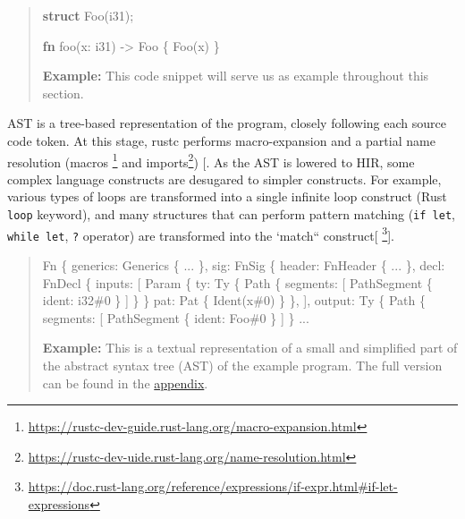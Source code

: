 \documentclass[
  11pt,
  twoside]{report}
\newenvironment{Shaded}{}{}
\newcommand{\KeywordTok}[1]{\textbf{#1}}
\newcommand{\NormalTok}[1]{#1}
\newcommand{\OperatorTok}[1]{#1}
\begin{document}
\begin{quote}
\begin{Shaded}
\begin{Highlighting}[]
\KeywordTok{struct}\NormalTok{ Foo(i31)}\OperatorTok{;}

\KeywordTok{fn}\NormalTok{ foo(x}\OperatorTok{:}\NormalTok{ i31) }\OperatorTok{{-}\textgreater{}}\NormalTok{ Foo }\OperatorTok{\{}
\NormalTok{    Foo(x)}
\OperatorTok{\}}
\end{Highlighting}
\end{Shaded}

\textbf{Example:} This code snippet will serve us as example throughout
this section.
\end{quote}

AST is a tree-based representation of the program, closely following
each source code token. At this stage, rustc performs macro-expansion
and a partial name resolution (macros \footnote{\url{https://rustc-dev-guide.rust-lang.org/macro-expansion.html}}
and imports\footnote{\url{https://rustc-dev-uide.rust-lang.org/name-resolution.html}})
{[}\citeproc{ref-devguide}{13}{]}. As the AST is lowered to HIR, some
complex language constructs are desugared to simpler constructs. For
example, various types of loops are transformed into a single infinite
loop construct (Rust \texttt{loop} keyword), and many structures that
can perform pattern matching (\texttt{if\ let}, \texttt{while\ let},
\texttt{?} operator) are transformed into the `match``
construct{[} \footnote{\url{https://doc.rust-lang.org/reference/expressions/if-expr.html\#if-let-expressions}}{]}.

\begin{quote}
\begin{Shaded}
\begin{Highlighting}[]
\NormalTok{Fn \{}
\NormalTok{  generics: Generics \{ ... \},}
\NormalTok{  sig: FnSig \{}
\NormalTok{    header: FnHeader \{ ... \},}
\NormalTok{    decl: FnDecl \{}
\NormalTok{      inputs: [}
\NormalTok{        Param \{}
\NormalTok{          ty: Ty \{ }
\NormalTok{            Path \{ segments: [ PathSegment \{ ident: i32\#0 \} ] \}}
\NormalTok{          \}}
\NormalTok{          pat: Pat \{ Ident(x\#0) \}}
\NormalTok{        \},}
\NormalTok{      ],}
\NormalTok{      output: Ty \{ Path \{ segments: [ PathSegment \{ ident: Foo\#0 \} ] \}}
\NormalTok{  ... }
\end{Highlighting}
\end{Shaded}

\textbf{Example:} This is a textual representation of a small and
simplified part of the abstract syntax tree (AST) of the example
program. The full version can be found in the
\hyperref[abstract-syntax-tree-ast]{appendix}.
\end{quote}
\end{document}
